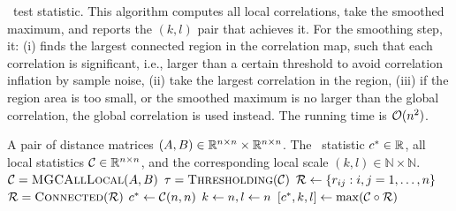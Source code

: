 \documentclass{article}
\begin{document}
\begin{algorithm}
\caption{\Mgc~test statistic. This algorithm computes all local correlations, take the smoothed maximum, and reports the $(k,l)$ pair that achieves it. For the smoothing step, it: (i) finds the largest connected region in the correlation map, such that each correlation is significant, i.e., larger than a certain threshold to avoid correlation inflation by sample noise, (ii) take the largest correlation in the region, (iii) if the region area is too small, or the smoothed maximum is no larger than the global correlation, the global correlation is used instead. The running time is $\mathcal{O}(n^2)$.}
\label{alg:sample_mgc}
\begin{algorithmic}[1]
\Require A pair of distance matrices $(A, B) \in \mathbb{R}^{n \times n} \times \mathbb{R}^{n \times n}$.
\Ensure The \Mgc~statistic $c^{*} \in \mathbb{R}$, all local statistics $\mathcal{C} \in \mathbb{R}^{n \times n}$, and the corresponding local scale $(k,l) \in \mathbb{N} \times \mathbb{N}$.
\State $\mathcal{C}=\textsc{MGCAllLocal}(A,B)$ 
\State $\tau = \textsc{Thresholding}(\mathcal{C})$ 
 
\State $\mathcal{R} \leftarrow \{r_{ij} : i,j = 1,\ldots, n\}$ 
\State $\mathcal{R}  = \textsc{Connected}(\mathcal{R} )$ 
\State $c^{*} \leftarrow \mathcal{C}(n,n)$ 
\State $k \leftarrow n, l \leftarrow n$
 
\State $[c^{*},k,l] \leftarrow \max (\mathcal{C} \circ \mathcal{R})$ 
\EndIf
\EndFunction
\end{algorithmic}
\end{algorithm}

\clearpage



\end{document}
